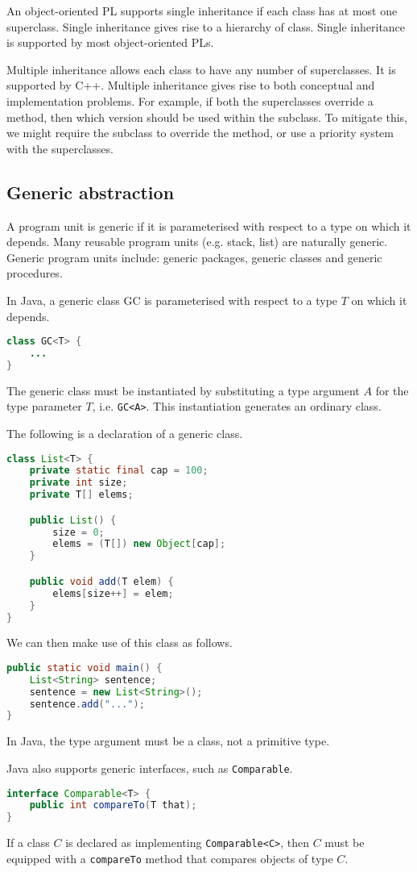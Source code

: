 \documentclass[a4paper, openany]{memoir}
\begin{document}
An object-oriented PL supports single inheritance if each class has at most one superclass. Single inheritance gives rise to a hierarchy of class. Single inheritance is supported by most object-oriented PLs. 

Multiple inheritance allows each class to have any number of superclasses. It is supported by C++. Multiple inheritance gives rise to both conceptual and implementation problems. For example, if both the superclasses override a method, then which version should be used within the subclass. To mitigate this, we might require the subclass to override the method, or use a priority system with the superclasses.

\subsection{Generic abstraction}
A program unit is generic if it is parameterised with respect to a type on which it depends. Many reusable program units (e.g. stack, list) are naturally generic. Generic program units include: generic packages, generic classes and generic procedures.

In Java, a generic class GC is parameterised with respect to a type $T$ on which it depends.
\begin{lstlisting}[language=Java]
class GC<T> {
    ...
}
\end{lstlisting}
The generic class must be instantiated by substituting a type argument $A$ for the type parameter $T$, i.e. \texttt{GC<A>}. This instantiation generates an ordinary class.

The following is a declaration of a generic class.
\begin{lstlisting}[language=Java]
class List<T> {
    private static final cap = 100;
    private int size;
    private T[] elems;

    public List() {
        size = 0;
        elems = (T[]) new Object[cap];
    }

    public void add(T elem) {
        elems[size++] = elem;
    }
}
\end{lstlisting}
We can then make use of this class as follows.
\begin{lstlisting}[language=Java]
public static void main() {
    List<String> sentence;
    sentence = new List<String>();
    sentence.add("...");
}
\end{lstlisting}
In Java, the type argument must be a class, not a primitive type.

Java also supports generic interfaces, such as \texttt{Comparable}.
\begin{lstlisting}[language=Java]
interface Comparable<T> {
    public int compareTo(T that);
}
\end{lstlisting}
If a class $C$ is declared as implementing \texttt{Comparable<C>}, then $C$ must be equipped with a \texttt{compareTo} method that compares objects of type $C$.
\end{document}
